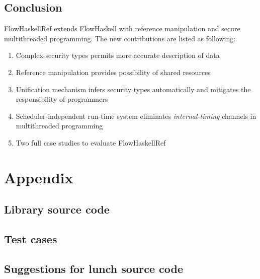 \documentclass[a4paper]{report}
\newcommand{\suggestions}{Suggestions for lunch \texttrademark }
\begin{document}
\section{Conclusion}
FlowHaskellRef extends FlowHaskell with reference manipulation and secure multithreaded programming.
The new contributions are listed as following:
\begin{enumerate}
\item Complex security types permits more accurate description of data
\item Reference manipulation provides possibility of shared resources
\item Unification mechanism infers security types automatically and mitigates the responsibility of programmers
\item Scheduler-independent run-time system eliminates {\em internal-timing} channels in multithreaded programming
\item Two full case studies to evaluate FlowHaskellRef
\end{enumerate}


\chapter*{Appendix}

\setcounter{section}{0}
\renewcommand\thesection{\Alph{section}}

\section{Library source code}

\section{Test cases}

\section{\suggestions source code}





\end{document}
